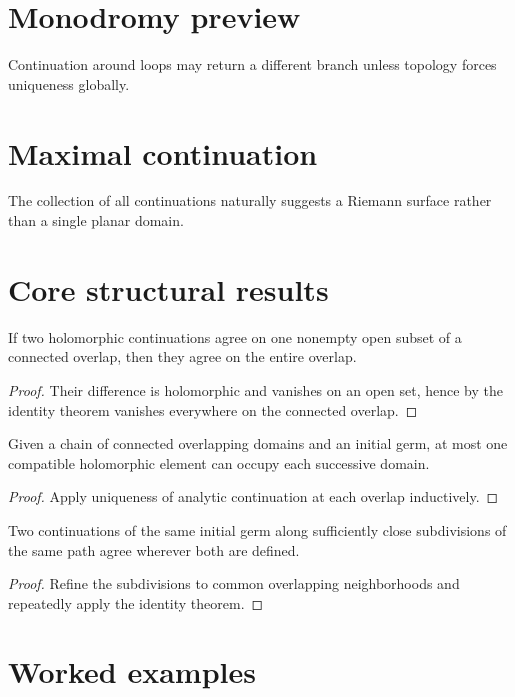 \section{Monodromy preview}
Continuation around loops may return a different branch unless topology forces uniqueness globally.

\section{Maximal continuation}
The collection of all continuations naturally suggests a Riemann surface rather than a single planar domain.

\section{Core structural results}

\begin{theorem}\label{thm:iv15-01}
If two holomorphic continuations agree on one nonempty open subset of a connected overlap, then they agree on the entire overlap.
\begin{proof}
Their difference is holomorphic and vanishes on an open set, hence by the identity theorem vanishes everywhere on the connected overlap.
\end{proof}
\end{theorem}

\begin{theorem}\label{thm:iv15-02}
Given a chain of connected overlapping domains and an initial germ, at most one compatible holomorphic element can occupy each successive domain.
\begin{proof}
Apply uniqueness of analytic continuation at each overlap inductively.
\end{proof}
\end{theorem}

\begin{theorem}\label{thm:iv15-03}
Two continuations of the same initial germ along sufficiently close subdivisions of the same path agree wherever both are defined.
\begin{proof}
Refine the subdivisions to common overlapping neighborhoods and repeatedly apply the identity theorem.
\end{proof}
\end{theorem}

\section{Worked examples}

